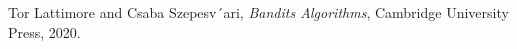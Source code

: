 \documentclass[opre,nonblindrev]{informs3} %
\begin{document}
%
%
%





\begin{thebibliography}{1}
        Tor Lattimore and Csaba Szepesv´ari,
        \emph{Bandits Algorithms},
        Cambridge University Press,
        2020.
\end{thebibliography}




\end{document}
